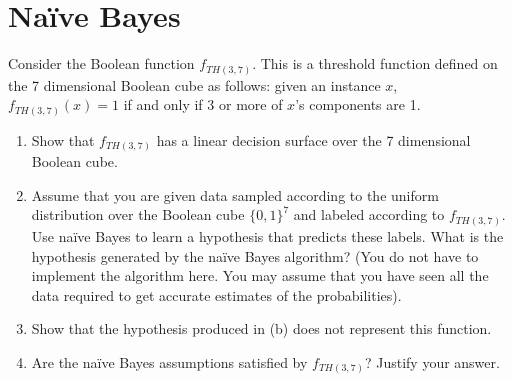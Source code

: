 \section{Na\"ive Bayes}
\label{sec:bayes}
Consider the Boolean function $f_{TH(3,7)}$.  This is a threshold function defined on the 7 dimensional Boolean cube as follows: given an instance $x$, $f_{TH(3,7)}(x) = 1$ if and only if 3 or more of $x$'s components are 1.

\begin{enumerate}
\item
Show that $f_{TH(3,7)}$ has a linear decision surface over the 7 dimensional Boolean cube.

\item Assume that you are given data sampled according to the uniform
  distribution over the Boolean cube $\{0, 1\}^7$ and labeled
  according to $f_{TH(3,7)}$. Use na\"ive Bayes to learn a hypothesis
  that predicts these labels. What is the hypothesis generated by the
  na\"ive Bayes algorithm? (You do not have to implement the algorithm
  here. You may assume that you have seen all the data required to get
  accurate estimates of the probabilities).

\item Show that the hypothesis produced in (b) does not represent this function.

\item Are the na\"ive Bayes assumptions satisfied by $f_{TH(3,7)}$?  Justify your answer.

\end{enumerate}


